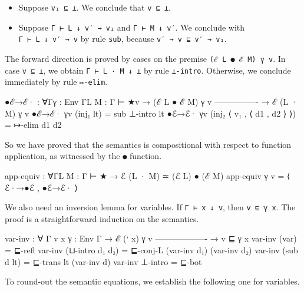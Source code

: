 \begin{itemize}
  \begin{itemize}
  \tightlist
  \item
    Suppose \texttt{v₁\ ⊑\ ⊥}. We conclude that \texttt{v\ ⊑\ ⊥}.
  \item
    Suppose \texttt{Γ\ ⊢\ L\ ↓\ v′\ →\ v₁} and \texttt{Γ\ ⊢\ M\ ↓\ v′}.
    We conclude with \texttt{Γ\ ⊢\ L\ ↓\ v′\ →\ v} by rule \texttt{sub},
    because \texttt{v′\ →\ v\ ⊑\ v′\ →\ v₁}.
  \end{itemize}
\end{itemize}

The forward direction is proved by cases on the premise
\texttt{(ℰ\ L\ ●\ ℰ\ M)\ γ\ v}. In case \texttt{v\ ⊑\ ⊥}, we obtain
\texttt{Γ\ ⊢\ L\ ·\ M\ ↓\ ⊥} by rule \texttt{⊥-intro}. Otherwise, we
conclude immediately by rule \texttt{↦-elim}.

\begin{fence}
\begin{code}
●ℰ→ℰ· : ∀{Γ}{γ : Env Γ}{L M : Γ ⊢ ★}{v}
  → (ℰ L ● ℰ M) γ v
    ----------------
  → ℰ (L · M) γ v
●ℰ→ℰ· {γ}{v} (inj₁ lt) = sub ⊥-intro lt
●ℰ→ℰ· {γ}{v} (inj₂ ⟨ v₁ , ⟨ d1 , d2 ⟩ ⟩) = ↦-elim d1 d2
\end{code}
\end{fence}

So we have proved that the semantics is compositional with respect to
function application, as witnessed by the \texttt{●} function.

\begin{fence}
\begin{code}
app-equiv : ∀{Γ}{L M : Γ ⊢ ★}
  → ℰ (L · M) ≃ (ℰ L) ● (ℰ M)
app-equiv γ v = ⟨ ℰ·→●ℰ , ●ℰ→ℰ· ⟩
\end{code}
\end{fence}

We also need an inversion lemma for variables. If
\texttt{Γ\ ⊢\ x\ ↓\ v}, then \texttt{v\ ⊑\ γ\ x}. The proof is a
straightforward induction on the semantics.

\begin{fence}
\begin{code}
var-inv : ∀ {Γ v x} {γ : Env Γ}
  → ℰ (` x) γ v
    -------------------
  → v ⊑ γ x
var-inv (var) = ⊑-refl
var-inv (⊔-intro d₁ d₂) = ⊑-conj-L (var-inv d₁) (var-inv d₂)
var-inv (sub d lt) = ⊑-trans lt (var-inv d)
var-inv ⊥-intro = ⊑-bot
\end{code}
\end{fence}

To round-out the semantic equations, we establish the following one for
variables.

